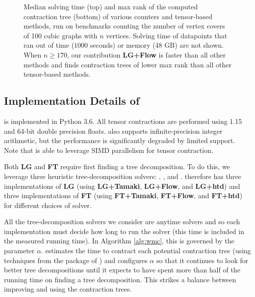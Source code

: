 \begin{figure}
	\centering
	
	
	\caption{\label{fig:cubic-time} Median solving time (top) and max rank of the computed contraction tree (bottom) of various counters and tensor-based methods, run on benchmarks counting the number of vertex covers of 100 cubic graphs with $n$ vertices. Solving time of datapoints that ran out of time ($1000$ seconds) or memory (48 GB) are not shown. When $n \geq 170$, our contribution \textbf{LG+Flow} is faster than all other methods and finds contraction trees of lower max rank than all other tensor-based methods.}
\end{figure}

\subsection{Implementation Details of }
\label{sec:tensors:experiments:implementation}
 is implemented in Python 3.6. All tensor contractions are performed using  1.15 and 64-bit double precision floats.  also supports infinite-precision integer arithmetic, but the performance is significantly degraded by limited  support. Note that  is able to leverage SIMD parallelism for tensor contraction.

Both \textbf{LG} and \textbf{FT} require first finding a tree decomposition. To do this, we leverage three heuristic tree-decomposition solvers:  \cite{Tamaki17},  \cite{HS18}, and  \cite{AMW17}.  therefore has three implementations of \textbf{LG} (using \textbf{LG+Tamaki}, \textbf{LG+Flow}, and \textbf{LG+htd}) and three implementations of \textbf{FT} (using \textbf{FT+Tamaki}, \textbf{FT+Flow}, and \textbf{FT+htd}) for different choices of solver.

All the tree-decomposition solvers we consider are anytime solvers and so each implementation must decide how long to run the solver (this time is included in the measured running time). 
In Algorithm \ref{alg:wmc}, this is governed by the parameter $\alpha$.
 estimates the time to contract each potential contraction tree (using techniques from the  package of ) and configures $\alpha$ so that it continues to look for better tree decompositions until it expects to have spent more than half of the running time on finding a tree decomposition.  This strikes a balance between improving and using the contraction trees.

